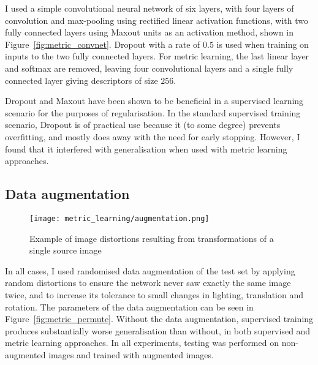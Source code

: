 I used a simple convolutional neural network of six layers, with four layers of convolution and max-pooling using rectified linear activation functions, with two fully connected layers using Maxout \cite{Springenberg2013} units as an activation method, shown in Figure~\ref{fig:metric_convnet}. Dropout \cite{HintonDropout} with a rate of $ 0.5 $ is used when training on inputs to the two fully connected layers. For metric learning, the last linear layer and softmax are removed, leaving four convolutional layers and a single fully connected layer giving descriptors of size $ 256 $.

Dropout and Maxout have been shown to be beneficial in a supervised learning scenario for the purposes of regularisation. In the standard supervised training scenario, Dropout is of practical use because it (to some degree) prevents overfitting, and mostly does away with the need for early stopping. However, I found that it interfered with generalisation when used with metric learning approaches.

\subsection {Data augmentation}

\begin{figure}[h]
\centering
\texttt{[image: metric\_learning/augmentation.png]}
\caption{Example of image distortions resulting from transformations of a single source image}
\label{fig:metric_augmentation}
\end{figure}


In all cases, I used randomised data augmentation of the test set by applying random distortions to ensure the network never saw exactly the same image twice, and to increase its tolerance to small changes in lighting, translation and rotation. The parameters of the data augmentation can be seen in Figure~\ref{fig:metric_permute}. Without the data augmentation, supervised training produces substantially worse generalisation than without, in both supervised and metric learning approaches. In all experiments, testing was performed on non-augmented images and trained with augmented images.

